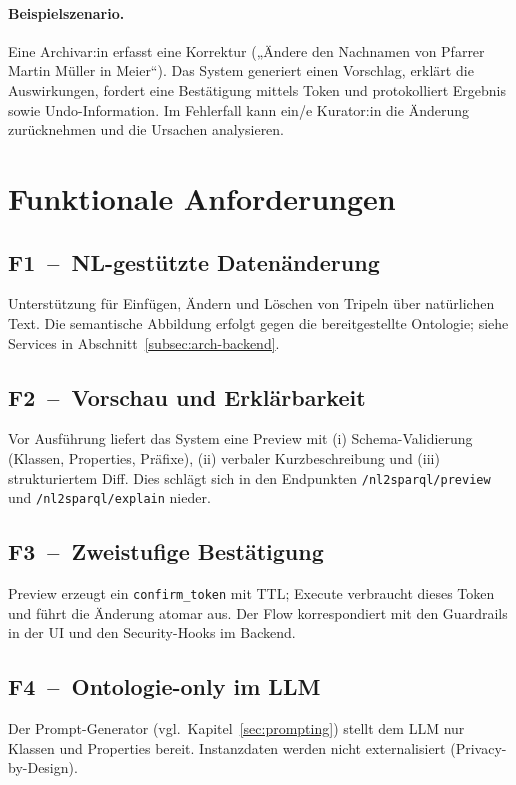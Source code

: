 \paragraph{Beispielszenario.} Eine Archivar:in erfasst eine Korrektur („Ändere den Nachnamen von Pfarrer Martin Müller in Meier“). Das System generiert einen Vorschlag, erklärt die Auswirkungen, fordert eine Bestätigung mittels Token und protokolliert Ergebnis sowie Undo-Information. Im Fehlerfall kann ein/e Kurator:in die Änderung zurücknehmen und die Ursachen analysieren.

\section{Funktionale Anforderungen}

\subsection*{F1~–~NL-gestützte Datenänderung}
Unterstützung für Einfügen, Ändern und Löschen von Tripeln über natürlichen Text. Die semantische Abbildung erfolgt gegen die bereitgestellte Ontologie; siehe Services in Abschnitt~\ref{subsec:arch-backend}.

\subsection*{F2~–~Vorschau und Erklärbarkeit}
Vor Ausführung liefert das System eine Preview mit (i) Schema-Validierung (Klassen, Properties, Präfixe), (ii) verbaler Kurzbeschreibung und (iii) strukturiertem Diff. Dies schlägt sich in den Endpunkten \texttt{/nl2sparql/preview} und \texttt{/nl2sparql/explain} nieder.

\subsection*{F3~–~Zweistufige Bestätigung}
Preview erzeugt ein \texttt{confirm\_token} mit TTL; Execute verbraucht dieses Token und führt die Änderung atomar aus. Der Flow korrespondiert mit den Guardrails in der UI und den Security-Hooks im Backend.

\subsection*{F4~–~Ontologie-only im LLM}
Der Prompt-Generator (vgl.\ Kapitel~\ref{sec:prompting}) stellt dem LLM nur Klassen und Properties bereit. Instanzdaten werden nicht externalisiert (Privacy-by-Design).

